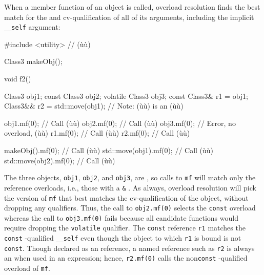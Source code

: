 When a member function of an object is called, overload resolution finds
the best match for the  and cv-qualification of
all of its arguments, including the implicit \lstinline!__self! argument:

\begin{emcppslisting}
#include <utility>  // (ù{}ù)

Class3 makeObj();

void f2()
{
    Class3          obj1;
    const Class3    obj2;
    volatile Class3 obj3;
    const Class3&   r1 = obj1;
    Class3&&        r2 = std::move(obj1);  // Note: (ù{}ù) is an (ù{}ù)

    obj1.mf(0);  // Call (ù{}ù)
    obj2.mf(0);  // Call (ù{}ù)
    obj3.mf(0);  // Error, no overload, (ù{}ù)
    r1.mf(0);    // Call (ù{}ù)
    r2.mf(0);    // Call (ù{}ù)

    makeObj().mf(0);        // Call (ù{}ù)
    std::move(obj1).mf(0);  // Call (ù{}ù)
    std::move(obj2).mf(0);  // Call (ù{}ù)
}
\end{emcppslisting}
    

\noindent The three objects, \lstinline!obj1!, \lstinline!obj2!, and \lstinline!obj3!, are
, so calls to \lstinline!mf! will match only the
 reference overloads, i.e., those with a \lstinline!&!
. As always, overload resolution will pick the
version of \lstinline!mf! that best matches the cv-qualification of the
object, without dropping any qualifiers. Thus, the call to
\lstinline!obj2.mf(0)! selects the \lstinline!const! overload whereas the call
to \lstinline!obj3.mf(0)! fails because all candidate functions would
require dropping the \lstinline!volatile! qualifier. The \lstinline!const!
 reference \lstinline!r1! matches the \lstinline!const!
-qualified \lstinline!__self! even though the object to
which \lstinline!r1! is bound is not \lstinline!const!. Though declared as an
 reference, a named reference such as \lstinline!r2! is always
an  when used in an expression; hence, \lstinline!r2.mf(0)!
calls the non\lstinline!const! -qualified overload of
\lstinline!mf!.

